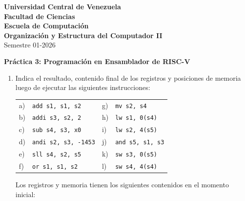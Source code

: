 \documentclass[letterpaper,12pt]{article}
\begin{document}

\noindent \textbf{Universidad Central de Venezuela}\\
\textbf{Facultad de Ciencias}\\
\textbf{Escuela de Computación}\\
\textbf{Organización y Estructura del Computador II}\\
Semestre 01-2026

\vspace{0.3cm}
\begin{center}
{\textbf{Práctica 3: Programación en Ensamblador de RISC-V}}
\end{center}
\vspace{0.5cm}


\begin{enumerate}

    \item Indica el resultado, contenido final de los registros y posiciones de memoria luego de ejecutar las siguientes instrucciones:
    \vspace{0.3cm}
    
    \begin{tabular}{ll@{\hspace{2.5cm}}ll}
        a) & \texttt{add s1, s1, s2} & g) & \texttt{mv s2, s4} \\
        b) & \texttt{addi s3, s2, 2} & h) & \texttt{lw s1, 0(s4)} \\
        c) & \texttt{sub s4, s3, x0} & i) & \texttt{lw s2, 4(s5)} \\
        d) & \texttt{andi s2, s3, -1453} & j) & \texttt{and s5, s1, s3} \\
        e) & \texttt{sll s4, s2, s5} & k) & \texttt{sw s3, 0(s5)} \\
        f) & \texttt{or s1, s1, s2} & l) & \texttt{sw s4, 4(s4)}
    \end{tabular}
    
    \vspace{0.5cm}
    Los registros y memoria tienen los siguientes contenidos en el momento inicial:
    \vspace{0.3cm}


\end{enumerate}
\end{document}
